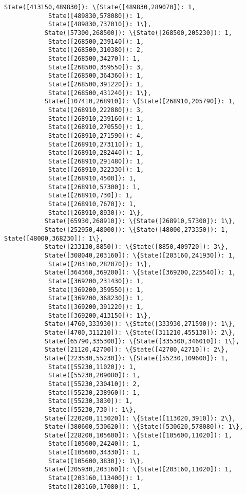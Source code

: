 \documentclass[11pt]{article}
\begin{document}
\begin{Verbatim}[commandchars=\\\{\}]
           State([413150,489830]): \{State([489830,289070]): 1,
            State([489830,578080]): 1,
            State([489830,737010]): 1\},
           State([57300,268500]): \{State([268500,205230]): 1,
            State([268500,239140]): 1,
            State([268500,310380]): 2,
            State([268500,34270]): 1,
            State([268500,359550]): 3,
            State([268500,364360]): 1,
            State([268500,391220]): 1,
            State([268500,431240]): 1\},
           State([107410,268910]): \{State([268910,205790]): 1,
            State([268910,222880]): 3,
            State([268910,239160]): 1,
            State([268910,270550]): 1,
            State([268910,271590]): 4,
            State([268910,273110]): 1,
            State([268910,282440]): 1,
            State([268910,291480]): 1,
            State([268910,322330]): 1,
            State([268910,4500]): 1,
            State([268910,57300]): 1,
            State([268910,730]): 1,
            State([268910,7670]): 1,
            State([268910,8930]): 1\},
           State([65930,268910]): \{State([268910,57300]): 1\},
           State([252950,48000]): \{State([48000,273350]): 1, State([48000,368230]): 1\},
           State([233130,8850]): \{State([8850,409720]): 3\},
           State([308040,203160]): \{State([203160,241930]): 1,
            State([203160,282070]): 1\},
           State([364360,369200]): \{State([369200,225540]): 1,
            State([369200,231430]): 1,
            State([369200,359550]): 1,
            State([369200,368230]): 1,
            State([369200,391220]): 1,
            State([369200,413150]): 1\},
           State([4760,333930]): \{State([333930,271590]): 1\},
           State([4700,311210]): \{State([311210,455130]): 2\},
           State([65790,335300]): \{State([335300,346010]): 1\},
           State([21120,42700]): \{State([42700,42710]): 2\},
           State([223530,55230]): \{State([55230,109600]): 1,
            State([55230,11020]): 1,
            State([55230,209080]): 1,
            State([55230,230410]): 2,
            State([55230,238960]): 1,
            State([55230,3830]): 1,
            State([55230,730]): 1\},
           State([220200,113020]): \{State([113020,3910]): 2\},
           State([380600,530620]): \{State([530620,578080]): 1\},
           State([228200,105600]): \{State([105600,11020]): 1,
            State([105600,24240]): 1,
            State([105600,34330]): 1,
            State([105600,3830]): 1\},
           State([205930,203160]): \{State([203160,11020]): 1,
            State([203160,113400]): 1,
            State([203160,17080]): 1,

\end{Verbatim}
\end{document}
